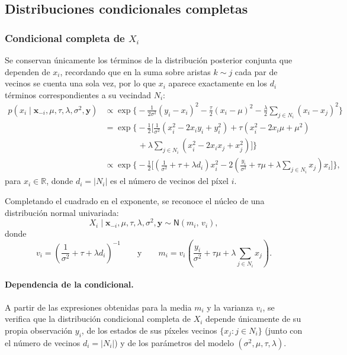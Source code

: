 \documentclass[11pt,a4paper]{article}
\begin{document}
\subsection{Distribuciones condicionales completas}

\subsubsection*{Condicional completa de $X_i$}

Se conservan únicamente los términos de la distribución posterior conjunta que dependen de $x_i$, recordando que en la suma sobre aristas $k \sim j$ cada par de vecinos se cuenta una sola vez, por lo que $x_i$ aparece exactamente en los $d_i$ términos correspondientes a su vecindad $N_i$:
\begin{align*}
p(x_i \mid \boldsymbol{x}_{-i}, \mu, \tau, \lambda, \sigma^2, \boldsymbol{y})
&\propto \exp\Big\{ -\frac{1}{2\sigma^2}(y_i - x_i)^2 - \frac{\tau}{2}(x_i - \mu)^2 - \frac{\lambda}{2}\sum_{j \in N_i}(x_i - x_j)^2 \Big\} \\[6pt]
&= \exp\Big\{ -\frac{1}{2}\Big[ \frac{1}{\sigma^2}(x_i^2 - 2x_i y_i + y_i^2) + \tau(x_i^2 - 2x_i\mu + \mu^2) \\
&\qquad\qquad + \lambda\sum_{j \in N_i}(x_i^2 - 2x_i x_j + x_j^2) \Big] \Big\} \\[6pt]
&\propto \exp\Big\{ -\frac{1}{2}\Big[ \left(\frac{1}{\sigma^2} + \tau + \lambda d_i\right)x_i^2 - 2\left(\frac{y_i}{\sigma^2} + \tau\mu + \lambda\sum_{j \in N_i} x_j\right)x_i \Big] \Big\},
\end{align*}
para $x_i \in \mathbb{R}$, donde $d_i = |N_i|$ es el número de vecinos del píxel $i$.

Completando el cuadrado en el exponente, se reconoce el núcleo de una distribución normal univariada:
\[
X_i \mid \boldsymbol{x}_{-i}, \mu, \tau, \lambda, \sigma^2, \boldsymbol{y} \sim \textsf{N}\!\left( m_i, \, v_i \right),
\]
donde
\[
v_i = \left(\frac{1}{\sigma^2} + \tau + \lambda d_i\right)^{-1}
\qquad \text{y} \qquad
m_i = v_i \left(\frac{y_i}{\sigma^2} + \tau\mu + \lambda\sum_{j \in N_i} x_j\right).
\]

\paragraph{Dependencia de la condicional.}
A partir de las expresiones obtenidas para la media $m_i$ y la varianza $v_i$, se verifica que la distribución condicional completa de $X_i$ depende únicamente de su propia observación $y_i$, de los estados de sus píxeles vecinos $\{x_j : j \in N_i\}$ (junto con el número de vecinos $d_i = |N_i|$) y de los parámetros del modelo $(\sigma^2, \mu, \tau, \lambda)$.
\end{document}
